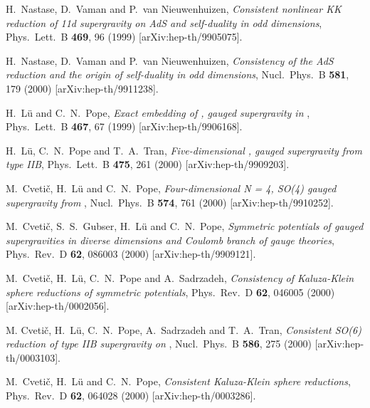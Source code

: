 \documentclass[a4paper,12pt]{article}
\begin{document}
\begin{thebibliography}{99}
H.~Nastase, D.~Vaman and P.~van Nieuwenhuizen,
{\sl Consistent nonlinear KK reduction of 11d supergravity on
AdS\coordHE{} and self-duality in odd dimensions},
Phys.\ Lett.\ B {\bf 469}, 96 (1999) [arXiv:hep-th/9905075].

H.~Nastase, D.~Vaman and P.~van Nieuwenhuizen,
{\sl Consistency of the AdS\coordHE{} reduction and the origin of
self-duality in odd dimensions},
Nucl.\ Phys.\ B {\bf 581}, 179 (2000) [arXiv:hep-th/9911238].

H.~L\"u and C.~N.~Pope,
{\sl Exact embedding of \coordHE{}, \coordHE{} gauged supergravity in \coordHE{}},
Phys.\ Lett.\ B {\bf 467}, 67 (1999) [arXiv:hep-th/9906168].

H.~L\"u, C.~N.~Pope and T.~A.~Tran,
{\sl Five-dimensional \coordHE{}, \coordHE{} gauged supergravity from
type IIB},
Phys.\ Lett.\ B {\bf 475}, 261 (2000) [arXiv:hep-th/9909203].

M.~Cveti\v{c}, H.~L\"u and C.~N.~Pope,
{\sl Four-dimensional N = 4, SO(4) gauged supergravity from \coordHE{}},
Nucl.\ Phys.\ B {\bf 574}, 761 (2000) [arXiv:hep-th/9910252].

M.~Cveti\v{c}, S.~S.~Gubser, H.~L\"u and C.~N.~Pope,
{\sl Symmetric potentials of gauged supergravities in diverse dimensions
and Coulomb branch of gauge theories},
Phys.\ Rev.\ D {\bf 62}, 086003 (2000) [arXiv:hep-th/9909121].

M.~Cveti\v{c}, H.~L\"u, C.~N.~Pope and A.~Sadrzadeh,
{\sl Consistency of Kaluza-Klein sphere reductions of symmetric potentials},
Phys.\ Rev.\ D {\bf 62}, 046005 (2000) [arXiv:hep-th/0002056].

M. Cveti\v{c}, H.~L\"u, C.~N.~Pope, A.~Sadrzadeh and T.~A.~Tran,
{\sl Consistent SO(6) reduction of type IIB supergravity on \coordHE{}},
Nucl.\ Phys.\ B {\bf 586}, 275 (2000) [arXiv:hep-th/0003103].

M.~Cveti\v{c}, H.~L\"u and C.~N.~Pope,
{\sl Consistent Kaluza-Klein sphere reductions},
Phys.\ Rev.\ D {\bf 62}, 064028 (2000) [arXiv:hep-th/0003286].


\end{thebibliography}
\end{document}
